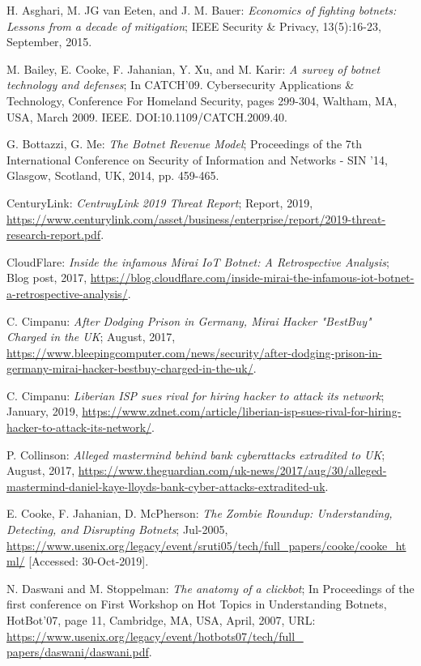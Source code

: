 \begin{thebibliography}{99}
 H. Asghari, M. JG van Eeten, and J. M. Bauer: \emph{Economics of fighting botnets: Lessons from a decade of mitigation}; IEEE Security \& Privacy, 13(5):16-23, September, 2015.

 M. Bailey, E. Cooke, F. Jahanian, Y. Xu, and M. Karir: \emph{A survey of botnet technology and defenses}; In CATCH'09. Cybersecurity Applications \& Technology, Conference For Homeland Security, pages 299-304, Waltham, MA, USA, March 2009. IEEE. DOI:10.1109/CATCH.2009.40.

 G. Bottazzi, G. Me: \emph{The Botnet Revenue Model}; Proceedings of the 7th International Conference on Security of Information and Networks - SIN '14, Glasgow, Scotland, UK, 2014, pp. 459-465.

  CenturyLink: \emph{CentruyLink 2019 Threat Report}; Report, 2019, \url{https://www.centurylink.com/asset/business/enterprise/report/2019-threat-research-report.pdf}.

 CloudFlare: \emph{Inside the infamous Mirai IoT Botnet: A Retrospective Analysis}; Blog post, 2017, \url{https://blog.cloudflare.com/inside-mirai-the-infamous-iot-botnet-a-retrospective-analysis/}.

 C. Cimpanu: \emph{After Dodging Prison in Germany, Mirai Hacker "BestBuy" Charged in the UK}; August, 2017, \url{https://www.bleepingcomputer.com/news/security/after-dodging-prison-in-germany-mirai-hacker-bestbuy-charged-in-the-uk/}.

 C. Cimpanu: \emph{Liberian ISP sues rival for hiring hacker to attack its network}; January, 2019, \url{https://www.zdnet.com/article/liberian-isp-sues-rival-for-hiring-hacker-to-attack-its-network/}.

 P. Collinson: \emph{Alleged mastermind behind bank cyberattacks extradited to UK}; August, 2017, \url{https://www.theguardian.com/uk-news/2017/aug/30/alleged-mastermind-daniel-kaye-lloyds-bank-cyber-attacks-extradited-uk}.

 E. Cooke, F. Jahanian, D. McPherson: \emph{The Zombie Roundup: Understanding, Detecting, and Disrupting Botnets}; Jul-2005, \url{https://www.usenix.org/legacy/event/sruti05/tech/full_papers/cooke/cooke_html/} [Accessed: 30-Oct-2019].

 N. Daswani and M. Stoppelman: \emph{The anatomy of a clickbot}; In Proceedings of the first conference on First Workshop on Hot Topics in Understanding Botnets, HotBot'07, page 11, Cambridge, MA, USA, April, 2007, URL: \url{https://www.usenix.org/legacy/event/hotbots07/tech/full_ papers/daswani/daswani.pdf}.


\end{thebibliography}
